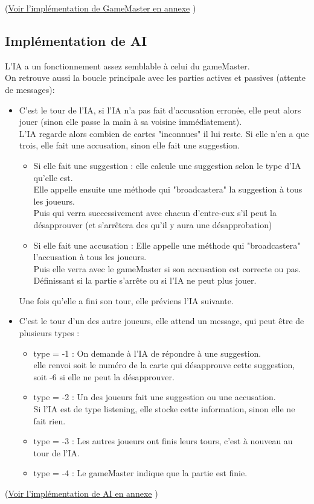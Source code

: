 \documentclass[a4paper,10pt]{article}
\begin{document}
		(\hyperlink{GameMasterImplementation}{Voir l'implémentation de GameMaster en annexe} )		
		
		

	
	\subsection{Implémentation de AI}
	L'IA a un fonctionnement assez semblable à celui du gameMaster.\\
	On retrouve aussi la boucle principale avec les parties actives et passives (attente de messages):
		\begin{itemize}
			\item C'est le tour de l'IA, si l'IA n'a pas fait d'accusation erronée, elle peut alors jouer (sinon elle passe la main à sa voisine immédiatement).\\
				L'IA regarde alors combien de cartes "inconnues" il lui reste. Si elle n'en a que trois, elle fait une accusation, sinon elle fait une suggestion.
				\begin{itemize}
					\item Si elle fait une suggestion : elle calcule une suggestion selon le type d'IA qu'elle est.\\
						Elle appelle ensuite une méthode qui "broadcastera" la suggestion à tous les joueurs.\\
						 Puis qui verra successivement avec chacun d'entre-eux s'il peut la désapprouver (et s'arrêtera des qu'il y aura une désapprobation)
					\item Si elle fait une accusation : Elle appelle une méthode qui "broadcastera" l'accusation à tous les joueurs.\\
						 Puis elle verra avec le gameMaster si son accusation est correcte ou pas. Définissant si la partie s'arrête ou si l'IA ne peut plus jouer.
				\end{itemize}
				Une fois qu'elle a fini son tour, elle préviens l'IA suivante.
			\item C'est le tour d'un des autre joueurs, elle attend un message, qui peut être de plusieurs types :
				\begin{itemize}
					\item type = -1 : On demande à l'IA de répondre à une suggestion.\\
								elle renvoi soit le numéro de la carte qui désapprouve cette suggestion, soit -6 si elle ne peut la désapprouver.
					\item type = -2 : Un des joueurs fait une suggestion ou une accusation.\\
								Si l'IA est de type listening, elle stocke cette information, sinon elle ne fait rien.
					\item type = -3 : Les autres joueurs ont finis leurs tours, c'est à nouveau au tour de l'IA.
					\item type = -4 : Le gameMaster indique que la partie est finie.
				\end{itemize}
		\end{itemize}
	(\hyperlink{AIimplementation}{Voir l'implémentation de AI en annexe} )
	
\end{document}
